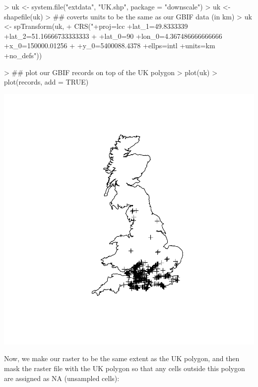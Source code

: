 \documentclass{article}[12pt, a4paper]
\begin{document}
\begin{Schunk}
\begin{Sinput}
> uk <- system.file("extdata", "UK.shp", package = "downscale")
> uk <- shapefile(uk)
> ## coverts units to be the same as our GBIF data (in km)
> uk <- spTransform(uk,
+                   CRS("+proj=lcc +lat_1=49.8333339 +lat_2=51.16666733333333 
+                       +lat_0=90 +lon_0=4.367486666666666 +x_0=150000.01256 
+                       +y_0=5400088.4378 +ellps=intl +units=km +no_defs"))
\end{Sinput}
\end{Schunk}

\begin{Schunk}
\begin{Sinput}
> ## plot our GBIF records on top of the UK polygon
> plot(uk)
> plot(records, add = TRUE)
\end{Sinput}
\end{Schunk}
\includegraphics{Downscaling-downscale38}

Now, we make our raster to be the same extent as the UK polygon, and then mask the raster file with the UK polygon so that any cells outside this polygon are assigned as NA (unsampled cells):
\end{document}
